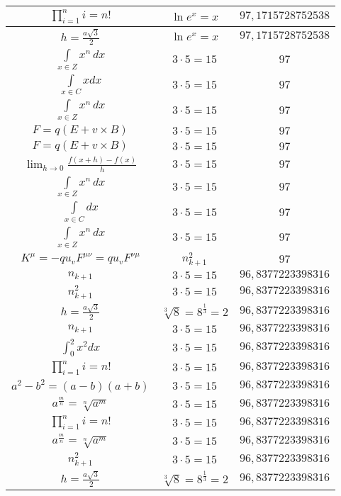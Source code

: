 \documentclass{article}
\begin{document}
\begin{flushleft}
\begin{longtable}{|c|c|c|}
$\prod_{i=1}^ni=n!$ & $\ln e^x=x$ & $97,1715728752538$ \\ \hline 
$h=\frac{a\sqrt{3}}{2}$ & $\ln e^x=x$ & $97,1715728752538$ \\ \hline 
$\int \limits_{x\in Z}\!x^{n}\,dx$ & $3\cdot 5=15$ & $97$ \\ \hline 
$\int \limits_{x\in C}xdx$ & $3\cdot 5=15$ & $97$ \\ \hline 
$\int \limits_{x\in Z}\!x^{n}\,dx$ & $3\cdot 5=15$ & $97$ \\ \hline 
$F=q\left(E+v\times B\right)$ & $3\cdot 5=15$ & $97$ \\ \hline 
$F=q\left(E+v\times B\right)$ & $3\cdot 5=15$ & $97$ \\ \hline 
$\lim_{h\to0}\frac{f(x+h)-f(x)}{h}$ & $3\cdot 5=15$ & $97$ \\ \hline 
$\int \limits_{x\in Z}\!x^{n}\,dx$ & $3\cdot 5=15$ & $97$ \\ \hline 
$\int \limits_{x\in C}dx$ & $3\cdot 5=15$ & $97$ \\ \hline 
$\int \limits_{x\in Z}\!x^{n}\,dx$ & $3\cdot 5=15$ & $97$ \\ \hline 
$K^\mu=-qu_vF^{\mu\nu}=qu_vF^{\nu\mu}$ & $n_{k+1}^2$ & $97$ \\ \hline 
$n_{k+1}$ & $3\cdot 5=15$ & $96,8377223398316$ \\ \hline 
$n_{k+1}^2$ & $3\cdot 5=15$ & $96,8377223398316$ \\ \hline 
$h=\frac{a\sqrt{3}}{2}$ & $\sqrt[3]{8}=8^{\frac{1}{3}}=2$ & $96,8377223398316$ \\ \hline 
$n_{k+1}$ & $3\cdot 5=15$ & $96,8377223398316$ \\ \hline 
$\int _0^2x^2dx$ & $3\cdot 5=15$ & $96,8377223398316$ \\ \hline 
$\prod_{i=1}^ni=n!$ & $3\cdot 5=15$ & $96,8377223398316$ \\ \hline 
$a^2-b^2=(a-b)(a+b)$ & $3\cdot 5=15$ & $96,8377223398316$ \\ \hline 
$a^{\frac{m}{n}}=\sqrt[n]{a^{m}}$ & $3\cdot 5=15$ & $96,8377223398316$ \\ \hline 
$\prod_{i=1}^ni=n!$ & $3\cdot 5=15$ & $96,8377223398316$ \\ \hline 
$a^{\frac{m}{n}}=\sqrt[n]{a^{m}}$ & $3\cdot 5=15$ & $96,8377223398316$ \\ \hline 
$n_{k+1}^2$ & $3\cdot 5=15$ & $96,8377223398316$ \\ \hline 
$h=\frac{a\sqrt{3}}{2}$ & $\sqrt[3]{8}=8^{\frac{1}{3}}=2$ & $96,8377223398316$ \\ \hline 

\end{longtable}
\end{flushleft}
\end{document}
